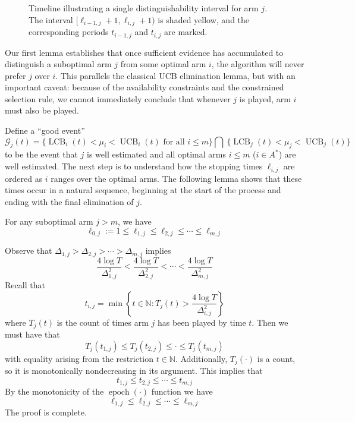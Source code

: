 \documentclass[opre,blindrev]{informs3}
\newcommand{\UCB}{\operatorname{UCB}}
\newcommand{\LCB}{\operatorname{LCB}}
\newcommand{\epoch}{\operatorname{epoch}}
\begin{document}
\begin{APPENDICES}
\begin{figure}[t]
    \caption{Timeline illustrating a single distinguishability interval for arm \(j\). The interval \([\ell_{i-1,j}+1, \ell_{i,j}+1)\) is shaded yellow, and the corresponding periods \(t_{i-1,j}\) and \(t_{i,j}\) are marked.}
    \label{fig:elimination-timeline}
\end{figure}

Our first lemma establishes that once sufficient evidence has accumulated to distinguish a suboptimal arm \(j\) from some optimal arm \(i\), the algorithm will never prefer \(j\) over \(i\). This parallels the classical UCB elimination lemma, but with an important caveat: because of the availability constraints and the constrained selection rule, we cannot immediately conclude that whenever \(j\) is played, arm \(i\) must also be played.

Define a ``good event''
\[
    \mathcal{G}_j(t)=\bigg\{\LCB_i(t)<\mu_i<\UCB_i(t) \text{ for all } i\leq m\bigg\} \bigcap ~\bigg\{\LCB_j(t)<\mu_j<\UCB_j(t)\bigg\}
\]
to be the event that \(j\) is well estimated and all optimal arms \(i\leq m\) (\(i\in A^*\)) are well estimated. The next step is to understand how the stopping times \(\ell_{i,j}\) are ordered as \(i\) ranges over the optimal arms. The following lemma shows that these times occur in a natural sequence, beginning at the start of the process and ending with the final elimination of \(j\).

\begin{lemma}\label{lem:ordered-intervals}
    For any suboptimal arm \(j>m\), we have
    \[\ell_{0,j}:=1\leq \ell_{1,j}\leq \ell_{2,j}\leq \cdots \leq \ell_{m,j}\]
\end{lemma}
    Observe that \(\Delta_{1,j}>\Delta_{2,j}>\cdots >\Delta_{m,j}\) implies 
    \[\frac{4\log T}{\Delta^2_{1,j}}<\frac{4\log T}{\Delta^2_{2,j}}<\cdots < \frac{4\log T}{\Delta^2_{m,j}}\]
    Recall that 
    \[t_{i,j} = \min\left\{t\in \mathbb{N}:T_j(t)>\frac{4\log T}{\Delta^2_{i,j}}\right\}\]
    where \(T_j(t)\) is the count of times arm \(j\) has been played by time \(t\). Then we must have that 
    \[T_j(t_{1,j})\leq T_j(t_{2,j})\leq \cdot \leq T_j(t_{m,j})\]
    with equality arising from the restriction \(t\in \mathbb{N}\). Additionally, \(T_j(\cdot)\) is a count, so it is monotonically nondecreasing in its argument. This implies that 
    \[t_{1,j}\leq t_{2,j} \leq \cdots \leq t_{m,j}\]
    By the monotonicity of the \(\epoch(\cdot)\) function we have 
    \[\ell_{1,j}\leq \ell_{2,j}\leq \cdots \leq \ell_{m,j}\]
The proof is complete.
\Halmos  


\end{APPENDICES}
\end{document}
